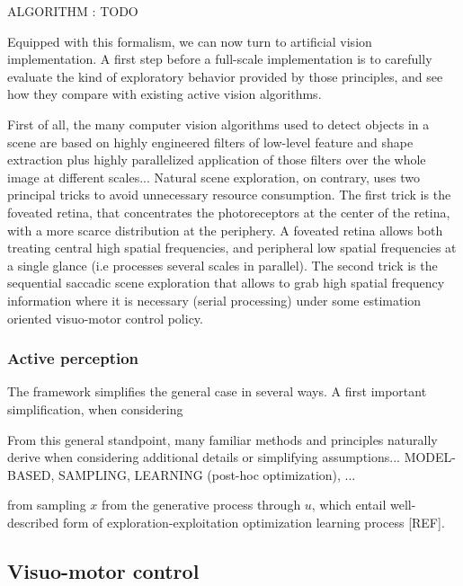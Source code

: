 \documentclass{article} %
\begin{document}
{\color{magenta} ALGORITHM : TODO} 

Equipped with this formalism, we can now turn to artificial vision implementation. 
A first step before a full-scale implementation is to carefully evaluate the kind of exploratory behavior provided by those principles, and see how they compare with existing active vision algorithms. 

{\color{blue}First of all, the many computer vision algorithms used to detect objects in a scene are based on highly engineered filters of low-level feature and shape extraction plus highly parallelized application of those filters over the whole image at different scales... Natural scene exploration, on contrary, uses two principal tricks to avoid unnecessary resource consumption. The first trick is the foveated retina, that concentrates the photoreceptors at the center of the retina, with a more scarce distribution at the periphery. A foveated retina allows both treating central high spatial frequencies, and peripheral low spatial frequencies at a single glance (i.e processes several scales in parallel). The second trick is the sequential saccadic scene exploration that allows to grab high spatial frequency information where it is necessary (serial processing) under some estimation oriented visuo-motor control policy. }





\subsubsection{Active perception}

The framework simplifies the general case in several ways. A first important simplification, when considering 

{\color{green} From this general standpoint, many familiar methods and principles naturally derive when considering additional details or simplifying assumptions... MODEL-BASED, SAMPLING, LEARNING (post-hoc optimization), ...}

{\color{green} from sampling $x$ from the generative process through $u$, which entail well-described form of exploration-exploitation optimization learning process [REF].}





\subsection{Visuo-motor control}
\end{document}
